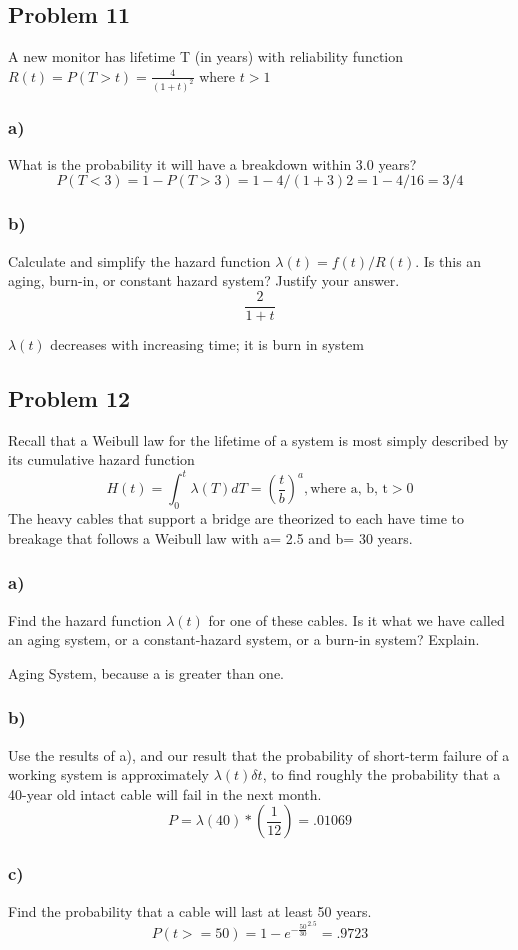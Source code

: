 \documentclass{article}
\begin{document}
\subsection*{Problem 11}
A new monitor has lifetime T (in years) with reliability function $R(t) = P( T > t) = \frac{4}{(1+t)^2}$ where $t > 1$
\subsubsection*{a)}
What is the probability it will have a breakdown within 3.0 years?
\begin{equation}
    P(T<3)=1-P(T>3)=1-4/(1+3)2 =1-4/16 = \boxed{3/4}
\end{equation}
\subsubsection*{b)}
Calculate and simplify the hazard function $\lambda(t) = f(t)/R(t)$. Is this an aging, burn-in, or constant hazard system? Justify your answer.
\begin{equation}
    \boxed{\frac{2}{1+t}}
\end{equation}
\begin{center}
    $\lambda(t)$ decreases with increasing time; it is burn in system
\end{center}
\newpage
\subsection*{Problem 12}
Recall that a Weibull law for the lifetime of a system is most simply described by its cumulative hazard function
\begin{equation}
    H(t) = \int_0^t \lambda(T)dT = (\frac{t}{b})^a, \text{where a, b, t} >0
\end{equation}
The heavy cables that support a bridge are theorized to each have time to breakage that follows a Weibull law with a= 2.5 and b= 30 years.
\subsubsection*{a)}
Find the hazard function $\lambda(t)$ for one of these cables. Is it what we have called an aging system, or a constant-hazard system, or a burn-in system? Explain.
\begin{center}
    Aging System, because a is greater than one.
\end{center}
\subsubsection*{b)}
Use the results of a), and our result that the probability of short-term failure of a working system is approximately $\lambda(t)\delta t$, to find roughly the probability that a 40-year old intact cable will fail in the next month.
\begin{equation}
    P = \lambda(40)*(\frac{1}{12}) = \boxed{.01069}
\end{equation}
\subsubsection*{c)}
Find the probability that a cable will last at least 50 years.
\begin{equation}
    P(t >= 50) = 1 - e^{-\frac{50}{30}^{2.5}} = \boxed{.9723}
\end{equation}
\end{document}
